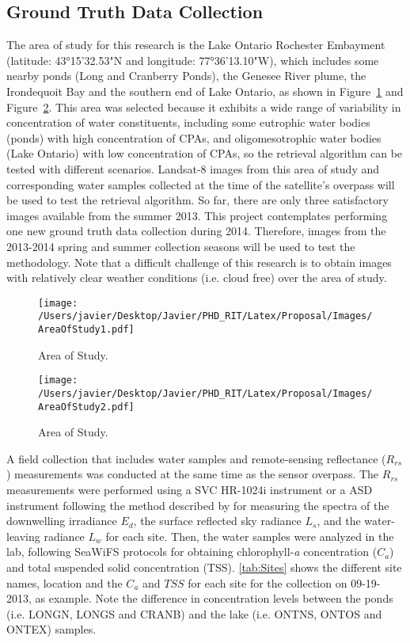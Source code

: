 \subsection{Ground Truth Data Collection}
The area of study for this research is the Lake Ontario Rochester Embayment (latitude: 43°15'32.53"N and longitude: 77°36'13.10"W), which includes some nearby ponds (Long and Cranberry Ponds), the Genesee River plume, the Irondequoit Bay and the southern end of Lake Ontario, as shown in Figure~\ref{fig:areaofstudy1} and Figure~\ref{fig:areaofstudy2}. This area was selected because it exhibits a wide range of variability in concentration of water constituents, including some eutrophic water bodies (ponds) with high concentration of CPAs, and oligomesotrophic water bodies (Lake Ontario) with low concentration of CPAs, so the retrieval algorithm can be tested with different scenarios. Landsat-8 images from this area of study and corresponding water samples collected at the time of the satellite's overpass will be used to test the retrieval algorithm. So far, there are only three satisfactory images available from the summer 2013. This project contemplates performing one new ground truth data collection during 2014. Therefore, images from the 2013-2014 spring and summer collection seasons will be used to test the methodology. Note that a difficult challenge of this research is to obtain images with relatively clear weather conditions (i.e. cloud free) over the area of study.
\begin{figure}[htb]
  \centering
  \texttt{[image: /Users/javier/Desktop/Javier/PHD\_RIT/Latex/Proposal/Images/AreaOfStudy1.pdf]}
  \caption{Area of Study. \label{fig:areaofstudy1} } 
\end{figure}
\begin{figure}[htb]
  \centering
  \texttt{[image: /Users/javier/Desktop/Javier/PHD\_RIT/Latex/Proposal/Images/AreaOfStudy2.pdf]}
  \caption{Area of Study. \label{fig:areaofstudy2} } 
\end{figure}
A field collection that includes water samples and remote-sensing reflectance ($R_{rs}$) measurements was conducted at the same time as the sensor overpass. The $R_{rs}$ measurements were performed using a SVC HR-1024i instrument\cite{SVCHR1024i} or a ASD instrument following the method described by \cite{Mobley:1999} for measuring the spectra of the downwelling irradiance $E_d$, the surface reflected sky radiance $L_s$, and the water-leaving radiance $L_w$ for each site. Then, the water samples were analyzed in the lab, following SeaWiFS protocols\cite{Mueller1995} for obtaining chlorophyll-{\it a} concentration ($C_a$) and total suspended solid concentration (TSS). \autoref{tab:Sites} shows the different site names, location and the $C_a$ and $TSS$ for each site for the collection on 09-19-2013, as example. Note the difference in concentration levels between the ponds (i.e. LONGN, LONGS and CRANB) and the lake (i.e. ONTNS, ONTOS and ONTEX) samples.

